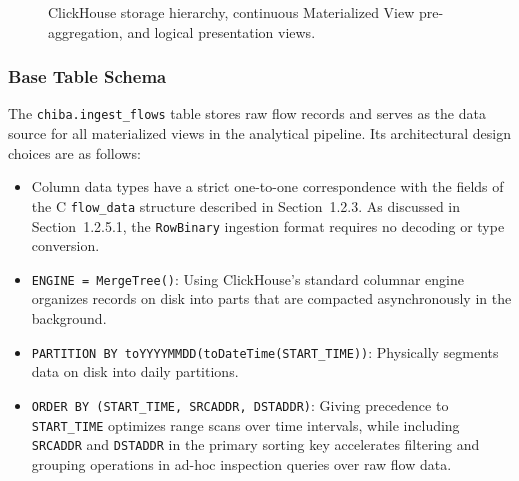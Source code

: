 \documentclass[11pt,a4paper]{article}
\begin{document}
\begin{figure}[!ht]
\caption{ClickHouse storage hierarchy, continuous Materialized View pre-aggregation, and logical presentation views.}
\label{fig:ch_pipeline}
\end{figure}

\subsubsection{Base Table Schema}
The \texttt{chiba.ingest\_flows} table stores raw flow records and serves as the data source for all materialized views in the analytical pipeline. Its architectural design choices are as follows:
\begin{itemize}
    \item Column data types have a strict one-to-one correspondence with the fields of the C \texttt{flow\_data} structure described in Section~1.2.3. As discussed in Section~1.2.5.1, the \texttt{RowBinary} ingestion format requires no decoding or type conversion.
    \item \texttt{ENGINE = MergeTree()}: Using ClickHouse's standard columnar engine organizes records on disk into parts that are compacted asynchronously in the background.
    \item \texttt{PARTITION BY toYYYYMMDD(toDateTime(START\_TIME))}: Physically segments data on disk into daily partitions.
    \item \texttt{ORDER BY (START\_TIME, SRCADDR, DSTADDR)}: Giving precedence to \texttt{START\_TIME} optimizes range scans over time intervals, while including \texttt{SRCADDR} and \texttt{DSTADDR} in the primary sorting key accelerates filtering and grouping operations in ad-hoc inspection queries over raw flow data.
\end{itemize}
\end{document}

